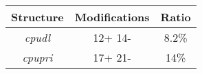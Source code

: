 \centering
\small
\renewcommand{\arraystretch}{1.5}
\begin{tabular}{|c|c|c|}
  \hline \textbf{Structure} & \textbf{Modifications} & \textbf{Ratio}\\[5pt]
  \hline \emph{cpudl} & 12+ 14- & 8.2\% \\
  \hline \emph{cpupri} & 17+ 21- & 14\% \\
  \hline
\end{tabular}

